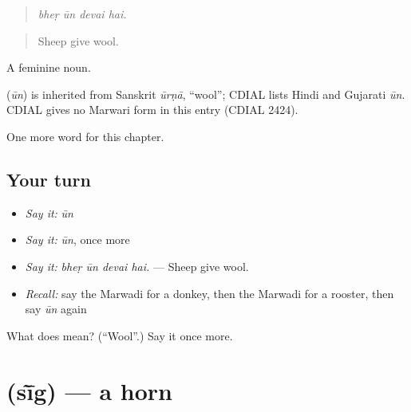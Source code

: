 \begin{quote}
   
\end{quote}

\begin{quote}
\emph{bheṛ ūn devai hai.}
\end{quote}

\begin{quote}
Sheep give wool.
\end{quote}

A feminine noun.

\begin{cousinweb}
\textbf{} (\emph{ūn}) is inherited from Sanskrit \emph{ūrṇā}, \textquotedblleft{}wool\textquotedblright{}; CDIAL lists Hindi and Gujarati \emph{ūn}. CDIAL gives no Marwari form in this entry (CDIAL 2424).
\end{cousinweb}

\begin{grammarlens}[title={What you've built}]
One more word for this chapter.
\end{grammarlens}

\subsection*{Your turn}
\begin{itemize}
\raggedright
  \item \emph{Say it:} \emph{ūn}
  \item \emph{Say it:} \emph{ūn}, once more
  \item \emph{Say it:} \emph{bheṛ ūn devai hai.} — Sheep give wool.
  \item \emph{Recall:} say the Marwadi for a donkey, then the Marwadi for a rooster, then say \emph{ūn} again
\end{itemize}

\begin{tcolorbox}[breakable,colback=teal!4,colframe=teal!35!black,title={Before you move on}]
What does  mean? (\textquotedblleft{}Wool\textquotedblright{}.) Say it once more.
\end{tcolorbox}
\section[\texorpdfstring{\mw{सींग} (sī̃g)}{सींग (sī̃g)}]{ (sī̃g) — a horn}

\label{lesson:MW-C236-sig}



